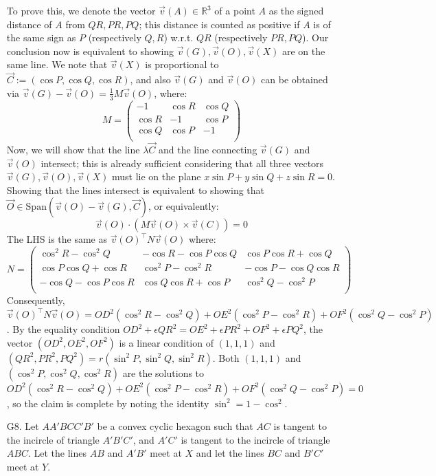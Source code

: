 \documentclass[11pt,a4paper]{article}
\begin{document}
\begin{enumerate}
    	To prove this, we denote the vector $\vec{v}(A)\in\mathbb{R}^3$ of a point $A$ as the signed distance of $A$ from $QR, PR, PQ$; this distance is counted as positive if $A$ is of the same sign as $P$ (respectively $Q, R$) w.r.t. $QR$ (respectively $PR, PQ$). Our conclusion now is equivalent to showing $\vec{v}(G), \vec{v}(O), \vec{v}(X)$ are on the same line. We note that $\vec{v}(X)$ is proportional to $\vec{C}:=(\cos P, \cos Q, \cos R)$, and also $\vec{v}(G)$ and $\vec{v}(O)$ can be obtained via $\vec{v}(G) - \vec{v}(O) = \frac{1}{3}M\vec{v}(O)$, where:
    	$$
    	M = \begin{pmatrix}
    		-1 & \cos R & \cos Q\\
    		\cos R & -1 & \cos P\\
    		\cos Q & \cos P & -1\\
    	\end{pmatrix}
    	$$Now, we will show that the line $\lambda\vec{C}$ and the line connecting $\vec{v}(G)$ and $\vec{v}(O)$ intersect; this is already sufficient considering that all three vectors $\vec{v}(G), \vec{v}(O), \vec{v}(X)$ must lie on the plane $x\sin P + y\sin Q + z\sin R = 0$. Showing that the lines intersect is equivalent to showing that $\vec{O}\in \text{Span}(\vec{v}(O)-\vec{v}(G), \vec{C})$, or equivalently:
    	$$
    	\vec{v}(O)\cdot (M\vec{v}(O)\times \vec{v}(C)) = 0
    	$$The LHS is the same as $\vec{v}(O)^\top N \vec{v}(O)$ where:
    	$$
    	N = \begin{pmatrix}
    		\cos^2 R - \cos^2 Q & -\cos R - \cos P\cos Q & \cos P \cos R + \cos Q\\
    		\cos P \cos Q + \cos R & \cos^2 P - \cos^2 R & -\cos P - \cos Q \cos R\\
    		-\cos Q - \cos P \cos R & \cos Q \cos R +\cos P & \cos ^2 Q -\cos^2 P\\
    	\end{pmatrix}
    	$$Consequently, $\vec{v}(O)^\top N \vec{v}(O) = OD^2 (\cos^2 R - \cos^2 Q) + OE^2(\cos^2 P - \cos^2 R ) + OF^2(\cos ^2 Q -\cos^2 P)$. By the equality condition $OD^2+\epsilon QR^2 = OE^2 + \epsilon PR^2 + OF^2+\epsilon PQ^2$, the vector $(OD^2, OE^2, OF^2)$ is a linear condition of $(1, 1, 1)$ and $(QR^2, PR^2, PQ^2) = r(\sin^2 P, \sin^2 Q, \sin^2 R)$. Both $(1, 1, 1)$ and $(\cos^2 P, \cos^2 Q, \cos^2 R)$ are the solutions to $OD^2 (\cos^2 R - \cos^2 Q) + OE^2(\cos^2 P - \cos^2 R ) + OF^2(\cos ^2 Q -\cos^2 P)=0$, so the claim is complete by noting the identity $\sin^2 = 1-\cos^2$.
    	
    	\item [G8.]
    	Let $AA'BCC'B'$ be a convex cyclic hexagon such that $AC$ is tangent to the incircle of triangle $A'B'C'$, 
    	and $A'C'$ is tangent to the incircle of triangle $ABC$. 
    	Let the lines $AB$ and $A'B'$ meet at $X$ and let the lines $BC$ and $B'C'$ meet at $Y$.
    	

\end{enumerate}
\end{document}
